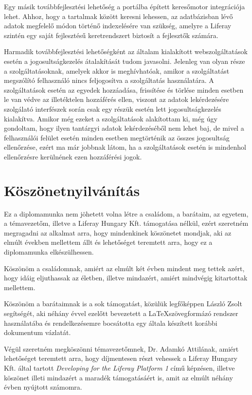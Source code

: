 \documentclass[hidelinks, 12pt, a4paper]{report}
\begin{document}
Egy másik továbbfejlesztési lehetőség a portálba épített keresőmotor integrációja lehet. Ahhoz, hogy a tartalmak között keresni lehessen, az adatbázisban lévő adatok megfelelő módon történő indexelésére van szükség, amelyre a Liferay szintén egy saját fejlesztésű keretrendszert biztosít a fejlesztők számára.

Harmadik továbbfejlesztési lehetőségként az általam kialakított webszolgáltatások esetén a jogosultságkezelés átalakítását tudom javasolni. Jelenleg van olyan része a szolgáltatásoknak, amelyek akkor is meghívhatóak, amikor a szolgáltatást megszólító felhasználó nincs feljogosítva a szolgáltatás használatára. A szolgáltatások esetén az egyedek hozzáadása, frissítése és törlése minden esetben le van védve az illetéktelen hozzáférés ellen, viszont az adatok lekérdezésére szolgálató interfészek során csak egy részük esetén lett jogosultságkezelés kialakítva. Amikor még ezeket a szolgáltatások alakítottam ki, még úgy gondoltam, hogy ilyen tantárgyi adatok lekérdezéséből nem lehet baj, de mivel a felhasználói felület esetén minden esetben megtörténik az összes jogosultság ellenőrzése, ezért ma már jobbnak látom, ha a szolgáltatások esetén is mindenhol ellenőrzésre kerülnének ezen hozzáférési jogok.

\clearpage
{}
\chapter*{Köszönetnyilvánítás}

Ez a diplomamunka nem jöhetett volna létre a családom, a barátaim, az egyetem, a témavezetőm, illetve a Liferay Hungary Kft. támogatása nélkül, ezért szeretném megragadni az alkalmat arra, hogy mindenkinek köszönetet mondjak, aki az elmúlt években mellettem állt és lehetőséget teremtett arra, hogy ez a diplomamunka elkészülhessen.

Köszönöm a családomnak, amiért az elmúlt két évben mindent meg tettek azért, hogy idáig eljuthassak az életben, illetve mindazért, amiért mindvégig kitartottak mellettem.

Köszönöm a barátaimnak is a sok támogatást, közülük legfőképpen László Zsolt segítségét, aki néhány évvel ezelőtt bevezetett a \LaTeX szövegformázó rendszer használatába és rendelkezésemre bocsátotta egy általa készített korábbi dokumentum vázlatát.

Végül szeretném megköszönni témavezetőmnek, Dr. Adamkó Attilának, amiért lehetőséget teremtett arra, hogy díjmentesen részt vehessek a Liferay Hungary Kft. által tartott \emph{Developing for the Liferay Platform 1} című képzésen, illetve köszönet illeti mindazért a maradék támogatásáért is, amit az elmúlt néhány évben nyújtott számomra.
\end{document}
